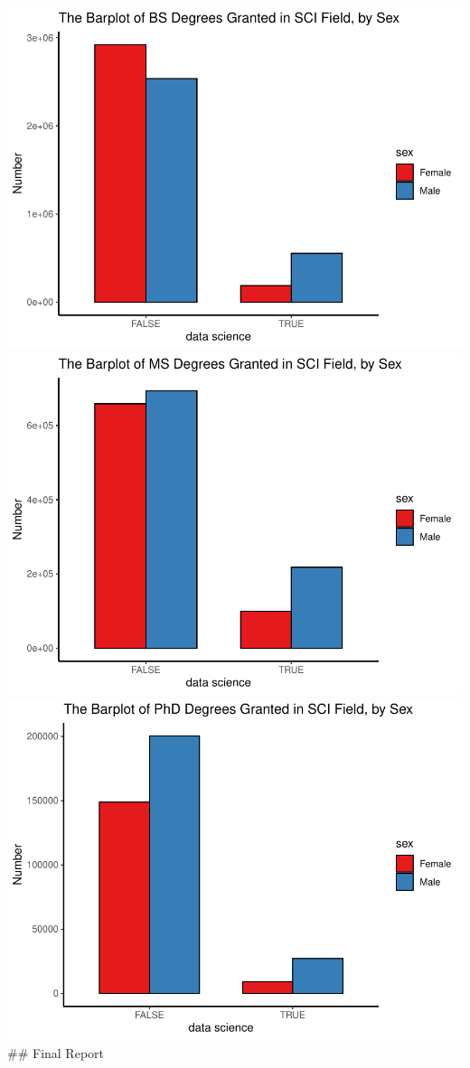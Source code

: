 \documentclass[
  12pt,
]{article}
\begin{document}
\includegraphics{hw1_sol_files/figure-latex/unnamed-chunk-13-1.pdf}
\includegraphics{hw1_sol_files/figure-latex/unnamed-chunk-13-2.pdf}
\includegraphics{hw1_sol_files/figure-latex/unnamed-chunk-13-3.pdf} \#\#
Final Report
\end{document}
